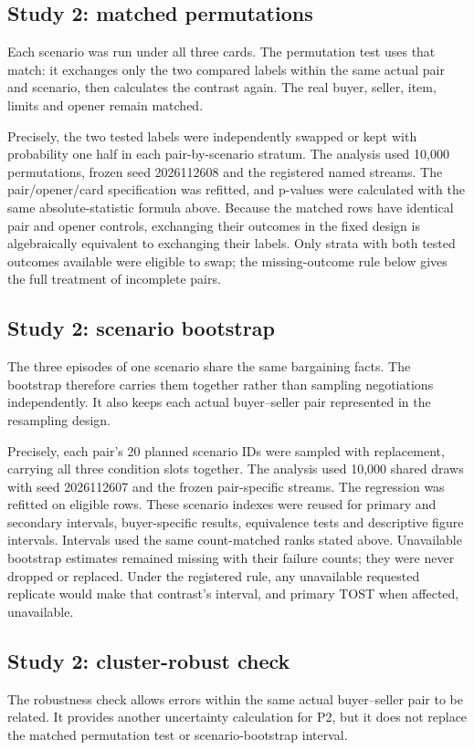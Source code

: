 \subsection{Study 2: matched permutations}
\label{subapp:study-2-matched-permutations}
Each scenario was run under all three cards. The permutation test uses that match: it exchanges only the two compared labels within the same actual pair and scenario, then calculates the contrast again. The real buyer, seller, item, limits and opener remain matched.

Precisely, the two tested labels were independently swapped or kept with probability one half in each pair-by-scenario stratum. The analysis used 10,000 permutations, frozen seed 2026112608 and the registered named streams. The pair/opener/card specification was refitted, and p-values were calculated with the same absolute-statistic formula above. Because the matched rows have identical pair and opener controls, exchanging their outcomes in the fixed design is algebraically equivalent to exchanging their labels. Only strata with both tested outcomes available were eligible to swap; the missing-outcome rule below gives the full treatment of incomplete pairs.

\subsection{Study 2: scenario bootstrap}
\label{subapp:study-2-scenario-bootstrap}
The three episodes of one scenario share the same bargaining facts. The bootstrap therefore carries them together rather than sampling negotiations independently. It also keeps each actual buyer--seller pair represented in the resampling design.

Precisely, each pair's 20 planned scenario IDs were sampled with replacement, carrying all three condition slots together. The analysis used 10,000 shared draws with seed 2026112607 and the frozen pair-specific streams. The regression was refitted on eligible rows. These scenario indexes were reused for primary and secondary intervals, buyer-specific results, equivalence tests and descriptive figure intervals. Intervals used the same count-matched ranks stated above. Unavailable bootstrap estimates remained missing with their failure counts; they were never dropped or replaced. Under the registered rule, any unavailable requested replicate would make that contrast's interval, and primary TOST when affected, unavailable.

\subsection{Study 2: cluster-robust check}
\label{subapp:study-2-cluster-robust-check}
The robustness check allows errors within the same actual buyer--seller pair to be related. It provides another uncertainty calculation for P2, but it does not replace the matched permutation test or scenario-bootstrap interval.

